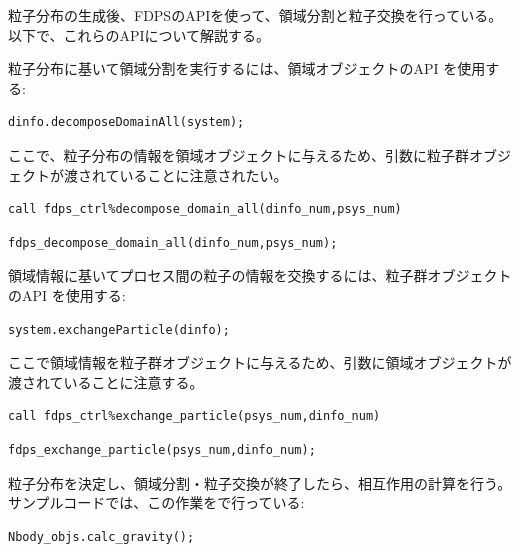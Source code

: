粒子分布の生成後、FDPSのAPIを使って、領域分割と粒子交換を行っている。
以下で、これらのAPIについて解説する。

粒子分布に基いて領域分割を実行するには、領域オブジェクトのAPI を使用する:
\ifCpp
\begin{lstlisting}[caption=領域分割の実行]
dinfo.decomposeDomainAll(system);
\end{lstlisting}
ここで、粒子分布の情報を領域オブジェクトに与えるため、引数に粒子群オブジェクトが渡されていることに注意されたい。
\endifCpp
\ifFtn
\begin{lstlisting}[caption=領域分割の実行]
call fdps_ctrl%decompose_domain_all(dinfo_num,psys_num)
\end{lstlisting}
\endifFtn
\ifC
\begin{lstlisting}[caption=領域分割の実行]
fdps_decompose_domain_all(dinfo_num,psys_num);
\end{lstlisting}
\endifC


領域情報に基いてプロセス間の粒子の情報を交換するには、粒子群オブジェクトのAPI を使用する:
\ifCpp
\begin{lstlisting}[caption=粒子交換の実行]
system.exchangeParticle(dinfo);
\end{lstlisting}
ここで領域情報を粒子群オブジェクトに与えるため、引数に領域オブジェクトが渡されていることに注意する。
\endifCpp
\ifFtn
\begin{lstlisting}[caption=粒子交換の実行]
call fdps_ctrl%exchange_particle(psys_num,dinfo_num)
\end{lstlisting}
\endifFtn
\ifC
\begin{lstlisting}[caption=粒子交換の実行]
fdps_exchange_particle(psys_num,dinfo_num);
\end{lstlisting}
\endifC

粒子分布を決定し、領域分割・粒子交換が終了したら、相互作用の計算を行う。
サンプルコードでは、この作業を\mainFunc で行っている:
\ifCpp
\begin{lstlisting}[caption=相互作用計算の実行]
Nbody_objs.calc_gravity();
\end{lstlisting}

